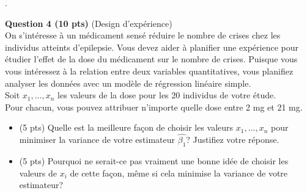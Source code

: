 \newpage
.
\newpage








\vspace{0.3in}
\textbf{Question 4 (10 pts)} (Design d'expérience)\\

On s'intéresse à un médicament sensé réduire le nombre de crises chez les individus atteints d'epilepsie. Vous devez aider à planifier une expérience pour étudier l'effet de la dose du médicament sur le nombre de crises. Puisque vous vous intéressez à la relation entre deux variables quantitatives, vous planifiez analyser les données avec un modèle de régression linéaire simple. \\

Soit $x_1, \ldots, x_n$ les valeurs de la dose pour les 20 individus de votre étude.\\ Pour chacun, vous pouvez attribuer n'importe quelle dose entre 2 mg et 21 mg. \\

\begin{itemize}
\item [(a)] (5 pts) Quelle est la meilleure fa\c{c}on de choisir les valeurs $x_1,\ldots,x_n$ pour minimiser la variance de votre estimateur $\hat{\beta_1}$? Justifiez votre réponse.
\vspace{0.1 in}
\item [(b)] (5 pts) Pourquoi ne serait-ce pas vraiment une bonne idée de choisir les valeurs de $x_i$ de cette façon, même si cela minimise la variance de votre estimateur?
\end{itemize}

 